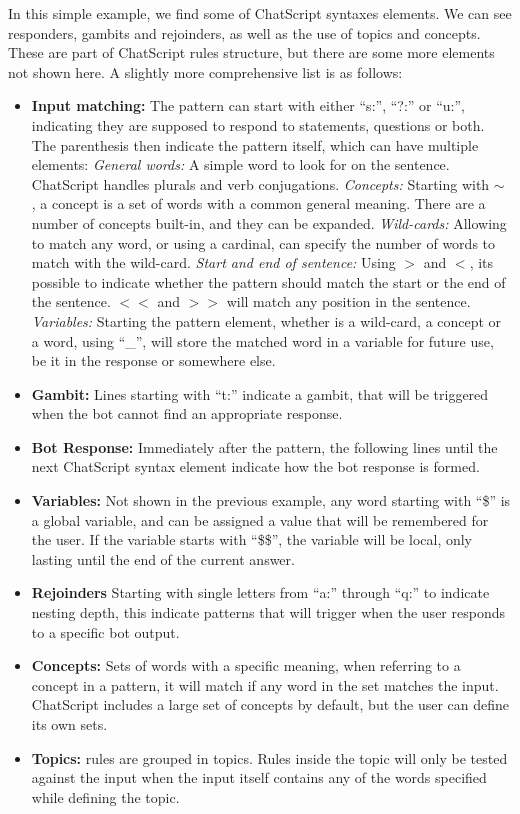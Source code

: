 In this simple example, we find some of ChatScript syntaxes elements. We can see responders, gambits and rejoinders, as well as the use of topics and concepts. These are part of ChatScript rules structure, but there are some more elements not shown here. A slightly more comprehensive list is as follows:
\begin{itemize}
 \item \textbf{Input matching:} The pattern can start with either ``s:'', ``?:'' or ``u:'', indicating they are supposed to respond to statements, questions or both. The parenthesis then indicate the pattern itself, which can have multiple elements:
    \subitem \emph{General words:} A simple word to look for on the sentence. ChatScript handles plurals and verb conjugations.
    \subitem \emph{Concepts:} Starting with $\sim$ , a concept is a set of words with a common general meaning. There are a number of concepts built-in, and they can be expanded.
    \subitem \emph{Wild-cards:} Allowing to match any word, or using a cardinal, can specify the number of words to match with the wild-card.
    \subitem \emph{Start and end of sentence:} Using $>$ and $<$, its possible to indicate whether the pattern should match the start or the end of the sentence. $<<$ and $>>$ will match any position in the sentence.
    \subitem \emph{Variables: } Starting the pattern element, whether is a wild-card, a concept or a word, using ``\_'', will store the matched word in a variable for future use, be it in the response or somewhere else.
  \item \textbf{Gambit:} Lines starting with ``t:'' indicate a gambit, that will be triggered when the bot cannot find an appropriate response.
  \item \textbf{Bot Response:} Immediately after the pattern, the following lines until the next ChatScript syntax element indicate how the bot response is formed.
  \item \textbf{Variables:} Not shown in the previous example, any word starting with ``\$'' is a global variable, and can be assigned a value that will be remembered for the user. If the variable starts with ``\$\$'', the variable will be local, only lasting until the end of the current answer.
  \item \textbf{Rejoinders} Starting with single letters from ``a:'' through ``q:'' to indicate nesting depth, this indicate patterns that will trigger when the user responds to a specific bot output.
  \item \textbf{Concepts:} Sets of words with a specific meaning, when referring to a concept in a pattern, it will match if any word in the set matches the input. ChatScript includes a large set of concepts by default, but the user can define its own sets.
  \item \textbf{Topics:} rules are grouped in topics. Rules inside the topic will only be tested against the input when the input itself contains any of the words specified while defining the topic.
\end{itemize}

